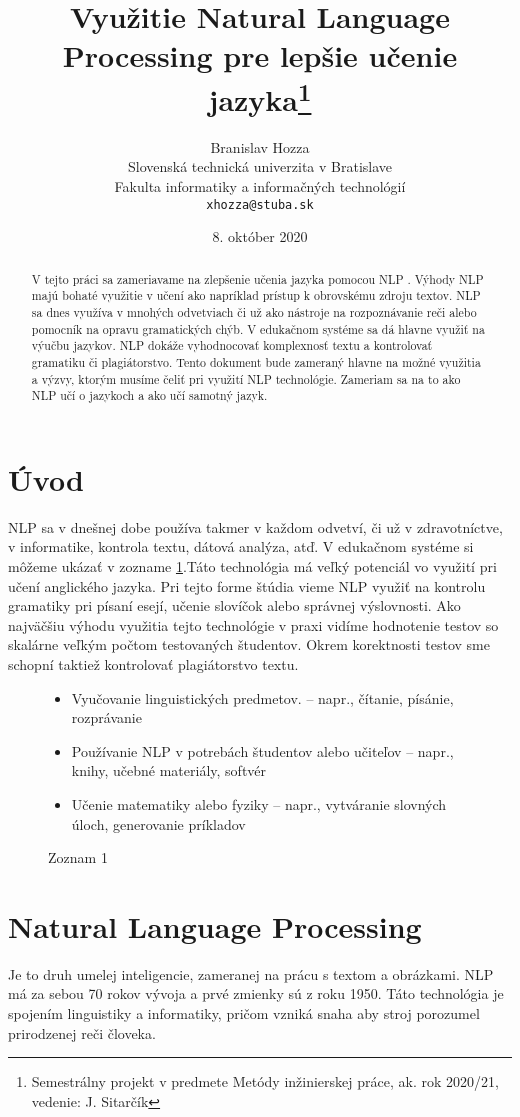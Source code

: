 \documentclass[10pt,twoside,slovak,a4paper]{article}
\title{Využitie Natural Language Processing pre lepšie učenie jazyka\thanks{Semestrálny projekt v predmete Metódy inžinierskej práce, ak. rok 2020/21, vedenie: J. Sitarčík}}
\author{Branislav Hozza\\[2pt]
	{\small Slovenská technická univerzita v Bratislave}\\
	{\small Fakulta informatiky a informačných technológií}\\
	{\small \texttt{xhozza@stuba.sk}}
	}
\date{\small 8. október 2020}
\begin{document}
\maketitle

\begin{abstract}
	V tejto práci sa zameriavame na zlepšenie učenia jazyka pomocou NLP \cite{NLP}. 
	Výhody NLP majú bohaté využitie v učení ako napríklad prístup k obrovskému zdroju textov. 
	NLP sa dnes využíva v mnohých odvetviach či už ako nástroje na rozpoznávanie reči alebo pomocník na opravu gramatických chýb. 
	V edukačnom systéme sa dá hlavne využiť na výučbu jazykov. NLP dokáže vyhodnocovať komplexnosť textu a kontrolovať gramatiku či plagiátorstvo. 
	Tento dokument bude zameraný hlavne na možné využitia a výzvy, ktorým musíme čeliť pri využití NLP technológie. 
	Zameriam sa na to ako NLP učí o jazykoch a ako učí samotný jazyk.
\end{abstract}

\section{Úvod}

NLP sa v dnešnej dobe používa takmer v každom odvetví, či už v zdravotníctve, v informatike, kontrola textu, dátová analýza, atď. 
V edukačnom systéme si môžeme ukázať v zozname \ref{zoznam_1}.Táto technológia má veľký potenciál vo využití pri učení anglického jazyka. 
Pri tejto forme štúdia vieme NLP využiť na kontrolu gramatiky pri písaní esejí, učenie slovíčok alebo správnej výslovnosti.
Ako najväčšiu výhodu využitia tejto technológie v praxi vidíme hodnotenie testov so skalárne veľkým počtom testovaných študentov. 
Okrem korektnosti testov sme schopní taktiež kontrolovať plagiátorstvo textu.
\begin{figure}[H]
	\centering
	\begin{itemize}\label{zoznam_1}
			\item Vyučovanie linguistických predmetov.
			– napr., čítanie, písánie, rozprávanie
			\item Používanie NLP v potrebách študentov alebo učiteľov
			– napr., knihy, učebné materiály, softvér
			\item Učenie matematiky alebo fyziky
			– napr., vytváranie slovných úloch, generovanie príkladov
			\end{itemize}
	\caption{Zoznam 1}
\end{figure}
\section{Natural Language Processing} \label{NLP}
Je to druh umelej inteligencie, zameranej na prácu s textom a obrázkami. 
NLP má za sebou 70 rokov vývoja a prvé zmienky sú z roku 1950\cite{historia}. 
Táto technológia je spojením linguistiky a informatiky, 
pričom vzniká snaha aby stroj porozumel prirodzenej reči človeka.
\end{document}
